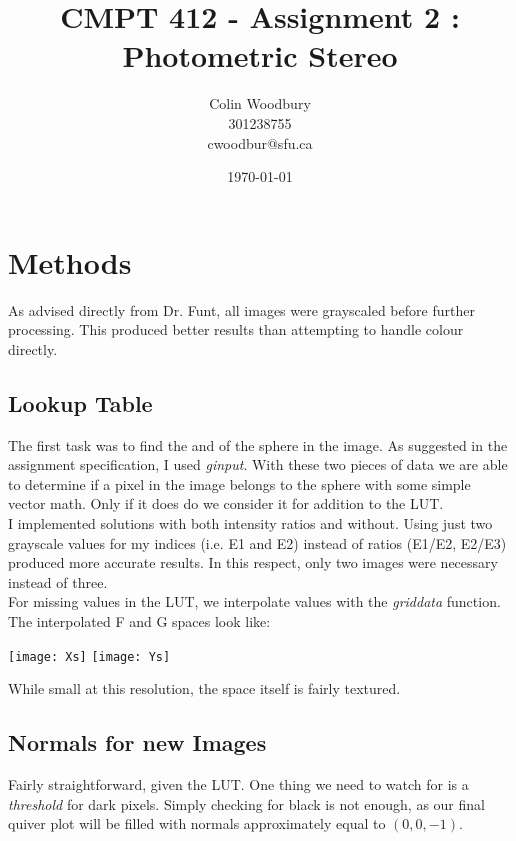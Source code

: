 \documentclass{article}
\begin{document}
\title{CMPT 412 - Assignment 2 : Photometric Stereo}
\author{Colin Woodbury\\ 301238755\\ cwoodbur@sfu.ca}
\date{\today}
\maketitle

\tableofcontents
\clearpage

\section{Methods}
As advised directly from Dr. Funt, all images were grayscaled before
further processing. This produced better results than attempting to
handle colour directly.

\subsection{Lookup Table}
The first task was to find the  and  of the
sphere in the image. As suggested in the assignment specification, I used
\emph{ginput}. With these two pieces of data we are able to determine
if a pixel in the image belongs to the sphere with some simple vector
math. Only if it does do we consider it for addition to the LUT.\\

I implemented solutions with both intensity ratios and without. Using just
two grayscale values for my indices (i.e. E1 and E2) instead of ratios
(E1/E2, E2/E3) produced more accurate results. In this respect, only
two images were necessary instead of three.\\

For missing values in the LUT, we interpolate values with
the \emph{griddata} function. The interpolated F and G spaces look like:

\begin{center}
  \texttt{[image: Xs]}
  \texttt{[image: Ys]}
\end{center}

While small at this resolution, the space itself is fairly textured.

\subsection{Normals for new Images}
Fairly straightforward, given the LUT. One thing we need to watch for is
a \emph{threshold} for dark pixels. Simply checking for black is not enough,
as our final quiver plot will be filled with normals approximately equal to
$(0,0,-1)$.
\end{document}

